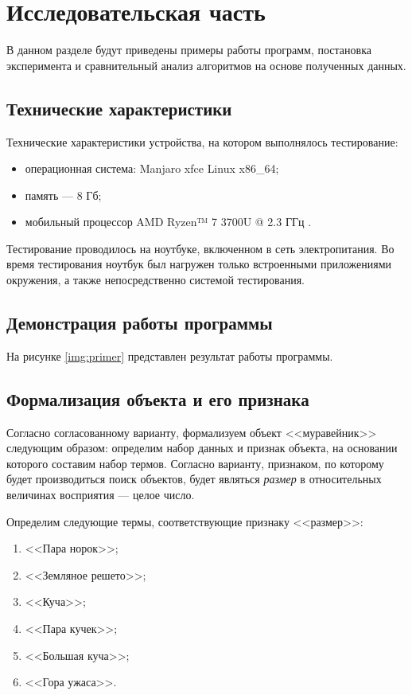\chapter{Исследовательская часть}

В данном разделе будут приведены примеры работы программ, постановка эксперимента и сравнительный анализ алгоритмов на основе полученных данных.

\section{Технические характеристики}

Технические характеристики устройства, на котором выполнялось тестирование:

\begin{itemize}
	\item операционная система: Manjaro xfce \cite{ubuntu} Linux \cite{linux} x86\_64;
	\item память --- 8 Гб;
	\item мобильный процессор AMD Ryzen™ 7 3700U @ 2.3 ГГц \cite{intel}.
\end{itemize}

Тестирование проводилось на ноутбуке, включенном в сеть электропитания. Во время тестирования ноутбук был нагружен только встроенными приложениями окружения, а также непосредственно системой тестирования.

\section{Демонстрация работы программы}

На рисунке \ref{img:primer} представлен результат работы программы.

\FloatBarrier

\section{Формализация объекта и его признака}
\label{formal}
Согласно согласованному варианту, формализуем объект <<муравейник>> следующим образом: определим набор данных и признак объекта, на основании которого составим набор термов. Согласно варианту, признаком, по которому будет производиться поиск объектов, будет являться \textit{размер} в относительных величинах восприятия --- целое число.

Определим следующие термы, соответствующие признаку <<размер>>:
\begin{enumerate}
	\item <<Пара норок>>;
	\item <<Земляное решето>>;
	\item <<Куча>>;
	\item <<Пара кучек>>;
	\item <<Большая куча>>;
	\item <<Гора ужаса>>.
\end{enumerate}

